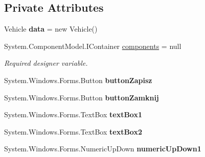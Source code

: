 \subsection*{Private Attributes}
\begin{DoxyCompactItemize}
\item 
\mbox{\label{class_statystyki___o_s_p_1_1_vehicle_from_a3506a3ec57a929617f173b1a499ec73e}} 
Vehicle {\bfseries data} = new Vehicle()
\item 
System.\+Component\+Model.\+I\+Container \mbox{\hyperlink{class_statystyki___o_s_p_1_1_vehicle_from_a9a58b474340ef8d0c5bbaa64e8b95dcf}{components}} = null
\begin{DoxyCompactList}\small\item\em Required designer variable. \end{DoxyCompactList}\item 
\mbox{\label{class_statystyki___o_s_p_1_1_vehicle_from_a196814731956b9302c90d4a923e30b21}} 
System.\+Windows.\+Forms.\+Button {\bfseries button\+Zapisz}
\item 
\mbox{\label{class_statystyki___o_s_p_1_1_vehicle_from_ab5d46aa2bb563834e202a6cfba5f326f}} 
System.\+Windows.\+Forms.\+Button {\bfseries button\+Zamknij}
\item 
\mbox{\label{class_statystyki___o_s_p_1_1_vehicle_from_a7dccb76111883b18c43db1b81dc911ac}} 
System.\+Windows.\+Forms.\+Text\+Box {\bfseries text\+Box1}
\item 
\mbox{\label{class_statystyki___o_s_p_1_1_vehicle_from_a975484f070929dd66fad2faa41679a83}} 
System.\+Windows.\+Forms.\+Text\+Box {\bfseries text\+Box2}
\item 
\mbox{\label{class_statystyki___o_s_p_1_1_vehicle_from_a88555cf8dc016aeb92627357e361f980}} 
System.\+Windows.\+Forms.\+Numeric\+Up\+Down {\bfseries numeric\+Up\+Down1}
\item 
\mbox{\label{class_statystyki___o_s_p_1_1_vehicle_from_a733b7a901f94b11fff1ea397cc8dccb7}} 

\end{DoxyCompactItemize}
